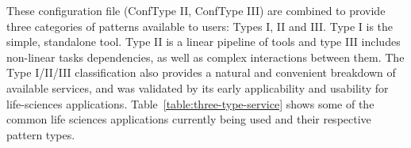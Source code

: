 \documentclass[]{svjour3}
\begin{document}









These configuration file (ConfType II, ConfType III) are combined to
provide three categories of patterns available to users: Types I, II
and III.  Type I is the simple, standalone tool.  Type II is a linear
pipeline of tools and type III includes non-linear tasks dependencies,
as well as complex interactions between them.  The Type I/II/III
classification also provides a natural and convenient breakdown of
available services, and was validated by its early applicability and
usability for life-sciences applications.
Table~\ref{table:three-type-service} shows some of the common life
sciences applications currently being used and their respective
pattern types.

\end{document}
